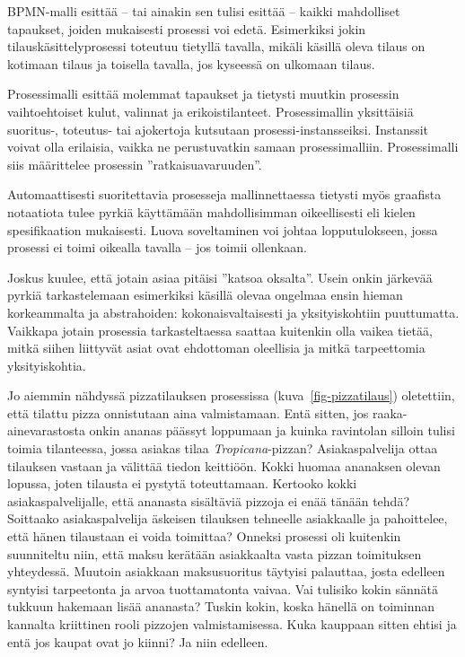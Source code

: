 \documentclass[
  finnish,
  letterpaper,
  DIV=11,
  numbers=noendperiod,
  oneside]{scrreprt}
\begin{document}
BPMN-malli esittää -- tai ainakin sen tulisi esittää -- kaikki
mahdolliset tapaukset, joiden mukaisesti prosessi voi edetä. Esimerkiksi
jokin tilauskäsittelyprosessi toteutuu tietyllä tavalla, mikäli käsillä
oleva tilaus on kotimaan tilaus ja toisella tavalla, jos kyseessä on
ulkomaan tilaus.

Prosessimalli esittää molemmat tapaukset ja tietysti muutkin prosessin
vaihtoehtoiset kulut, valinnat ja erikoistilanteet. Prosessimallin
yksittäisiä suoritus-, toteutus- tai ajokertoja kutsutaan
prosessi-instansseiksi. Instanssit voivat olla erilaisia, vaikka ne
perustuvatkin samaan prosessimalliin. Prosessimalli siis määrittelee
prosessin ''ratkaisuavaruuden''.

Automaattisesti suoritettavia prosesseja mallinnettaessa tietysti myös
graafista notaatiota tulee pyrkiä käyttämään mahdollisimman
oikeellisesti eli kielen spesifikaation
mukaisesti. Luova soveltaminen voi johtaa lopputulokseen, jossa prosessi
ei toimi oikealla tavalla -- jos toimii ollenkaan.

Joskus kuulee, että jotain asiaa pitäisi ''katsoa oksalta''. Usein onkin
järkevää pyrkiä tarkastelemaan esimerkiksi käsillä olevaa ongelmaa ensin
hieman korkeammalta ja abstrahoiden: kokonaisvaltaisesti ja
yksityiskohtiin puuttumatta. Vaikkapa jotain prosessia tarkasteltaessa
saattaa kuitenkin olla vaikea tietää, mitkä siihen liittyvät asiat ovat
ehdottoman oleellisia ja mitkä tarpeettomia yksityiskohtia.

Jo aiemmin nähdyssä pizzatilauksen prosessissa
(kuva~\ref{fig-pizzatilaus}) oletettiin, että tilattu pizza onnistutaan
aina valmistamaan. Entä sitten, jos raaka-ainevarastosta onkin ananas
päässyt loppumaan ja kuinka ravintolan silloin tulisi toimia
tilanteessa, jossa asiakas tilaa \emph{Tropicana}-pizzan?
Asiakaspalvelija ottaa tilauksen vastaan ja välittää tiedon keittiöön.
Kokki huomaa ananaksen olevan lopussa, joten tilausta ei pystytä
toteuttamaan. Kertooko kokki asiakaspalvelijalle, että ananasta
sisältäviä pizzoja ei enää tänään tehdä? Soittaako asiakaspalvelija
äskeisen tilauksen tehneelle asiakkaalle ja pahoittelee, että hänen
tilaustaan ei voida toimittaa? Onneksi prosessi oli kuitenkin
suunniteltu niin, että maksu kerätään asiakkaalta vasta pizzan
toimituksen yhteydessä. Muutoin asiakkaan maksusuoritus täytyisi
palauttaa, josta edelleen syntyisi tarpeetonta ja arvoa tuottamatonta
vaivaa. Vai tulisiko kokin sännätä tukkuun hakemaan lisää ananasta?
Tuskin kokin, koska hänellä on toiminnan kannalta kriittinen rooli
pizzojen valmistamisessa. Kuka kauppaan sitten ehtisi ja entä jos kaupat
ovat jo kiinni? Ja niin edelleen.
\end{document}
